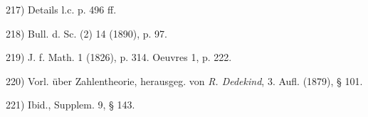 \vfill
\leftline{\rule{2in}{0.4pt}}
\vspace{0.2cm}
{
\footnotesize
217) Details l.c. p. 496 ff.

218) Bull. d. Sc. (2) 14 (1890), p. 97.

219) J. f. Math. 1 (1826), p. 314. Oeuvres 1, p. 222.

220) Vorl. über Zahlentheorie, herausgeg. von \textit{R. Dedekind}, 3. Aufl. (1879), § 101.

221) Ibid., Supplem. 9, § 143.

}